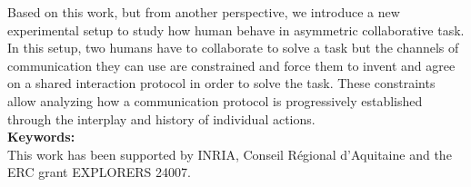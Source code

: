 \begin{vcenterpage}
Based on this work, but from another perspective, we introduce a new experimental setup to study how human behave in asymmetric collaborative task. In this setup, two humans have to collaborate to solve a task but the channels of communication they can use are constrained and force them to invent and agree on a shared interaction protocol in order to solve the task. These constraints allow analyzing how a communication protocol is progressively established through the interplay and history of individual actions.\\

{\large\textbf{Keywords:}} \\

This work has been supported by INRIA, Conseil R\'egional d'Aquitaine and the ERC grant EXPLORERS 24007.

\end{vcenterpage}
